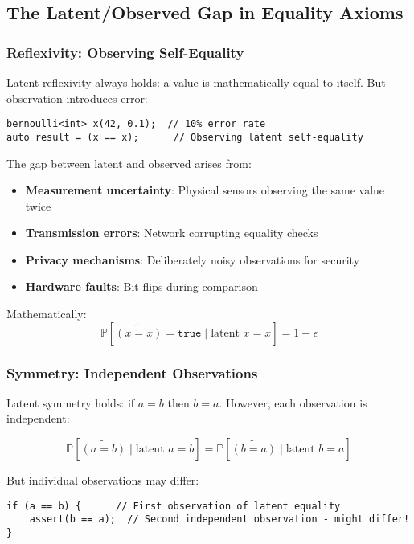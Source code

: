 \documentclass[11pt,final,hidelinks]{article}
\newcommand{\obs}[1]{\widetilde{#1}}  %
\newcommand{\True}{\mathtt{true}}
\newcommand{\ProbCond}[2]{\mathbb{P}\left[#1 \mid #2\right]}
\begin{document}
\subsection{The Latent/Observed Gap in Equality Axioms}

\subsubsection{Reflexivity: Observing Self-Equality}

Latent reflexivity always holds: a value is mathematically equal to itself. But observation introduces error:

\begin{verbatim}
bernoulli<int> x(42, 0.1);  // 10% error rate
auto result = (x == x);      // Observing latent self-equality
\end{verbatim}

The gap between latent and observed arises from:
\begin{itemize}
    \item \textbf{Measurement uncertainty}: Physical sensors observing the same value twice
    \item \textbf{Transmission errors}: Network corrupting equality checks
    \item \textbf{Privacy mechanisms}: Deliberately noisy observations for security
    \item \textbf{Hardware faults}: Bit flips during comparison
\end{itemize}

Mathematically:
\begin{equation}
\ProbCond{\obs{(x = x)} = \True}{\text{latent } x = x} = 1 - \epsilon
\end{equation}

\subsubsection{Symmetry: Independent Observations}

Latent symmetry holds: if $a = b$ then $b = a$. However, each observation is independent:

\begin{equation}
\ProbCond{\obs{(a = b)}}{\text{latent } a = b} = \ProbCond{\obs{(b = a)}}{\text{latent } b = a}
\end{equation}

But individual observations may differ:
\begin{verbatim}
if (a == b) {      // First observation of latent equality
    assert(b == a);  // Second independent observation - might differ!
}
\end{verbatim}
\end{document}
